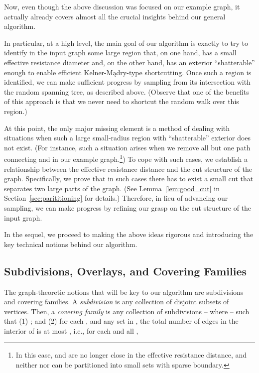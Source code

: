 \documentclass[11pt, letterpaper]{article}
\begin{document}
Now, even though the above discussion was focused on our example graph, it actually already covers almost all the crucial insights behind our general algorithm. 

In particular, at a high level, the main goal of our algorithm is exactly to try to identify in the input graph  some large region that, on one hand, has a small effective resistance diameter and, on the other hand, has an exterior ``shatterable'' enough to enable efficient Kelner-Mądry-type shortcutting. Once such a region is identified, we can make sufficient progress by sampling from its intersection with the random spanning tree, as described above. (Observe that one of the benefits of this approach is that we never need to shortcut the random walk over this region.)

At this point, the only major missing element is a method of dealing with situations when such a large small-radius region with ``shatterable'' exterior does not exist. (For instance, such a situation arises when we remove all but one path connecting  and  in our example graph.\footnote{In this case,  and  are no longer close in the effective resistance distance, and neither  nor  can be partitioned into small sets with sparse boundary.}) To cope with such cases, we establish a relationship between the effective resistance distance and the cut structure of the graph. Specifically, we prove that in such cases there has to exist a small cut that separates two large parts of the graph. (See Lemma~\ref{lem:good_cut} in Section~\ref{sec:parititioning} for details.) Therefore, in lieu of advancing our sampling, we can make progress by refining our grasp on the cut structure of the input graph. 

In the sequel, we proceed to making the above ideas rigorous and introducing the key technical notions behind our algorithm.









\subsection{Subdivisions, Overlays, and Covering Families}\label{sec:covering_families}

The graph-theoretic notions that will be key to our algorithm are subdivisions and covering families. A {\em subdivision}  is any collection of { disjoint} subsets of vertices. Then, a {\em covering family}  is any collection of  subdivisions  -- where  --  such that (1) ; and (2) for each , and any set  in , the total number of edges in the interior  of  is at most , i.e., for each  and all ,
\end{document}
